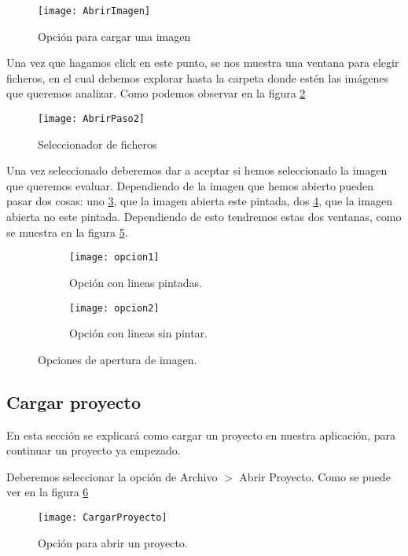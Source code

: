 \begin{figure}[h]
\centering
\texttt{[image: AbrirImagen]}
\caption{Opción para cargar una imagen}
\label{fig:abrirPro}
\end{figure}

Una vez que hagamos click en este punto, se nos muestra una ventana para elegir ficheros, en el cual debemos explorar hasta la carpeta donde estén las imágenes que queremos analizar. Como podemos observar en la figura \ref{fig:abrirPaso2}

\begin{figure}[h]
\centering
\texttt{[image: AbrirPaso2]}
\caption{Seleccionador de ficheros}
\label{fig:abrirPaso2}
\end{figure}

Una vez seleccionado deberemos dar a aceptar si hemos seleccionado la imagen que queremos evaluar.
Dependiendo de la imagen que hemos abierto pueden pasar dos cosas: uno \ref{fig:opcion1}, que la imagen abierta este pintada, dos \ref{fig:opcion2}, que la imagen abierta no este pintada. Dependiendo de esto tendremos estas dos ventanas, como se muestra en la figura \ref{fig:figuraTipos}.


\begin{figure}
	\begin{subfigure}[c]{.55\linewidth}
	\centering\large \texttt{[image: opcion1]}
	\caption{Opción con lineas pintadas.}\label{fig:opcion1}
	\end{subfigure}%
	\begin{subfigure}[c]{.55\linewidth}
	\centering\large \texttt{[image: opcion2]}
	\caption{Opción con lineas sin pintar.}\label{fig:opcion2}
	\end{subfigure}%
	\label{fig:figuraTipos}
	\caption{Opciones de apertura de imagen.}
\end{figure}




\subsection{Cargar proyecto}
\label{modo:2}

En esta sección se explicará como cargar un proyecto en nuestra aplicación, para continuar un proyecto ya empezado.

Deberemos seleccionar la opción de Archivo  $>$ Abrir Proyecto. Como se puede ver en la figura \ref{fig:cargarPro}


\begin{figure}[h]
\centering
\texttt{[image: CargarProyecto]}
\caption{Opción para abrir un proyecto.}
\label{fig:cargarPro}
\end{figure}

